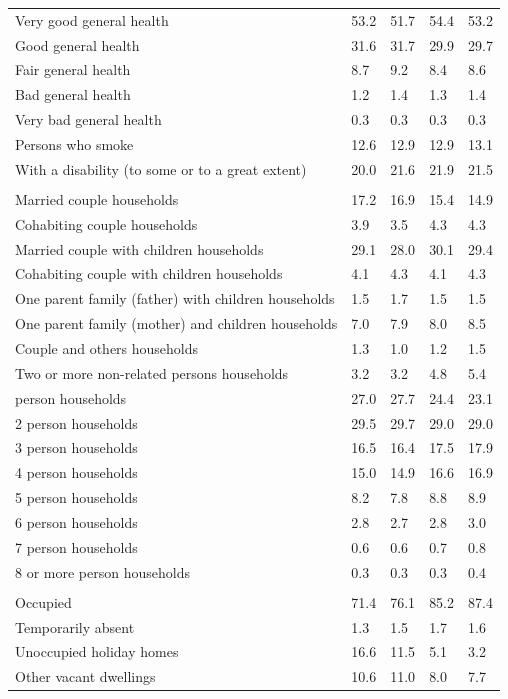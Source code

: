 \documentclass{article}
\begin{document}
\begin{table}[h]
\begin{tabular}{KTTTT}
    \hline
Very good general health & 53.2& 51.7&54.4& 53.2\\
Good general health & 31.6& 31.7& 29.9& 29.7\\
Fair general health & 8.7& 9.2&8.4& 8.6\\
Bad general health & 1.2& 1.4&1.3& 1.4\\
Very bad general health & 0.3& 0.3&0.3& 0.3\\
    \hline
Persons who smoke & 12.6& 12.9&12.9& 13.1\\
    \hline
With a disability (to some or to a great extent) & 20.0& 21.6&21.9& 21.5\\
\hline
    \\ 
    \hline
Married couple households & 17.2& 16.9& 15.4& 14.9\\
Cohabiting couple households & 3.9& 3.5& 4.3& 4.3\\
Married couple with children households & 29.1& 28.0& 30.1& 29.4\\
Cohabiting couple with children households & 4.1& 4.3& 4.1& 4.3\\
One parent family (father) with  children households & 1.5& 1.7& 1.5& 1.5\\
One parent family (mother) and children households & 7.0& 7.9& 8.0& 8.5\\
Couple and others households  & 1.3& 1.0& 1.2& 1.5\\
Two or more non-related persons households & 3.2& 3.2& 4.8& 5.4\\
     person households & 27.0& 27.7& 24.4& 23.1\\
2 person households & 29.5& 29.7& 29.0& 29.0\\
3 person households & 16.5& 16.4& 17.5& 17.9\\
4 person households & 15.0& 14.9& 16.6& 16.9\\
5 person households & 8.2& 7.8& 8.8& 8.9\\
6 person households & 2.8& 2.7& 2.8& 3.0\\
7 person households & 0.6& 0.6& 0.7& 0.8\\
8 or more person households & 0.3& 0.3& 0.3& 0.4\\
\hline
    \\ 
    \hline
Occupied & 71.4& 76.1& 85.2& 87.4\\
Temporarily absent & 1.3& 1.5& 1.7& 1.6\\
Unoccupied holiday homes & 16.6& 11.5&  5.1&  3.2\\
Other vacant dwellings & 10.6& 11.0&  8.0&  7.7\\
\hline
\end{tabular}
\end{table}
\end{document}
